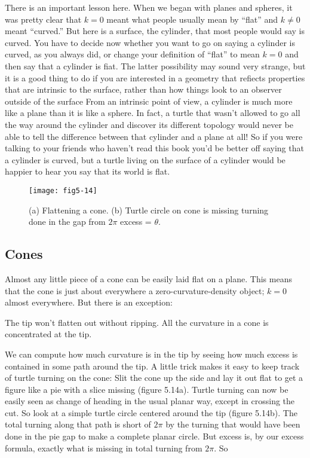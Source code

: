 \documentclass{book}
\begin{document}
There is an important lesson here. When we began with planes and
spheres, it was pretty clear that $k = 0 $ meant what people usually mean
by ``flat'' and $k \not= 0$ meant ``curved.'' But here is a surface, the cylinder,
that most people would say is curved. You have to decide now whether
you want to go on saying a cylinder is curved, as you always did, or
change your definition of ``flat'' to mean $k = 0$ and then say that a
cylinder is fiat. The latter possibility may sound very strange, but it
is a good thing to do if you are interested in a geometry that refiects
properties that are intrinsic to the surface, rather than how things look
to an observer outside of the surface From an intrinsic point of view,
a cylinder is much more like a plane than it is like a sphere. In fact,
a turtle that wasn't allowed to go all the way around the cylinder and
discover its different topology would never be able to tell the difference
between that cylinder and a plane at all! So if you were talking to your
friends who haven't read this book you'd be better off saying that a
cylinder is curved, but a turtle living on the surface of a cylinder would
be happier to hear you say that its world is flat.

\begin{figure}
\begin{center}
\texttt{[image: fig5-14]}
\caption{(a) Flattening a cone. (b) Turtle circle on cone is missing turning done in the gap from $2 \pi$ excess = $\theta$.}
\end{center}
\end{figure}

\subsection{Cones}

Almost any little piece of a cone can be easily laid flat on a plane.
This means that the cone is just about everywhere a zero-curvature-density object; $k = 0$ almost everywhere. But there is an exception:

The tip won't flatten out without ripping. All the curvature in a cone
is concentrated at the tip.

We can compute how much curvature is in the tip by seeing how much
excess is contained in some path around the tip. A little trick makes it
easy to keep track of turtle turning on the cone: Slit the cone up the side
and lay it out flat to get a figure like a pie with a slice missing (figure
5.14a). Turtle turning can now be easily seen as change of heading in
the usual planar way, except in crossing the cut. So look at a simple
turtle circle centered around the tip (figure 5.14b). The total turning
along that path is short of $2 \pi$ by the turning that would have been done
in the pie gap to make a complete planar circle. But excess is, by our
excess formula, exactly what is missing in total turning from $2 \pi$. So
\end{document}
